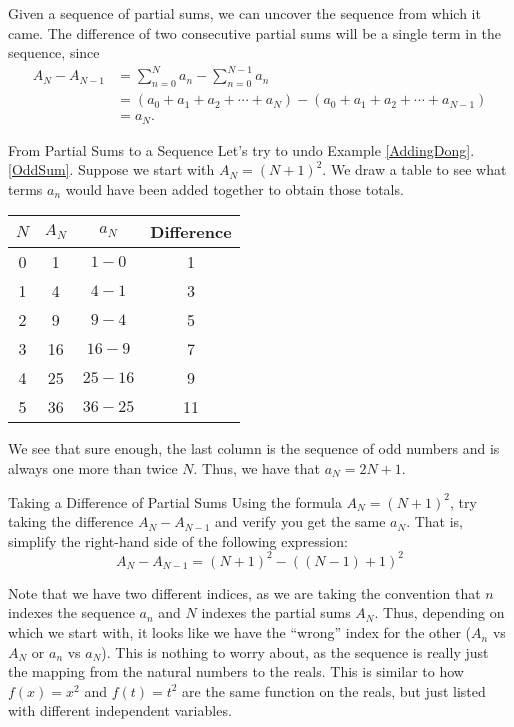 Given a sequence of partial sums, we can uncover the sequence from which it came.  The difference of two consecutive partial sums will be a single term in the sequence, since \begin{align*}
A_{N}-A_{N-1}&=\sum_{n=0}^Na_n-\sum_{n=0}^{N-1}a_n\\ &=\left( a_0+a_1+a_2+\cdots+a_N\right)-\left( a_0+a_1+a_2+\cdots+a_{N-1}\right) \\
&=a_N.
\end{align*}
\begin{example}{From Partial Sums to a Sequence} 
Let's try to undo Example \ref{AddingDong}.\ref{OddSum}.  Suppose we start with $A_N=(N+1)^2$.  We draw a table to see what terms $a_n$ would have been added together to obtain those totals. 
\begin{center}
\begin{tabular}{|c|c|c|c|} \hline
$N$ & $A_N$ & $a_N$ & Difference \\ \hline
0 & 1 & $1-0$ &1 \\
1 & 4 & $4-1$ &3 \\
2 & 9 & $9-4$ &5 \\
3 & 16 & $16-9$ &7 \\
4 & 25 & $25-16$ &9 \\
5 & 36 & $36-25$ &11 \\ \hline
\end{tabular}
\end{center}

We see that sure enough, the last column is the sequence of odd numbers and is always one more than twice $N$.  Thus, we have that $a_N=2N+1$. 

\end{example}

\begin{exercise}{Taking a Difference of Partial Sums \Coffeecup}
Using the formula $A_N=(N+1)^2$, try taking the difference $A_{N}-A_{N-1}$ and verify you get the same $a_N$.  That is, simplify the right-hand side of the following expression: $$ A_{N}-A_{N-1}=(N+1)^2-\left((N-1)+1\right)^2 $$
\end{exercise}

Note that we have two different indices, as we are taking the convention that $n$ indexes the sequence $a_n$ and $N$ indexes the partial sums $A_N$.  Thus, depending on which we start with, it looks like we have the ``wrong'' index for the other ($A_n$ vs $A_N$ or $a_n$ vs $a_N$).  This is nothing to worry about, as the sequence is really just the mapping from the natural numbers to the reals.  This is similar to how $f(x)=x^2$ and $f(t)=t^2$ are the same function on the reals, but just listed with different independent variables.

